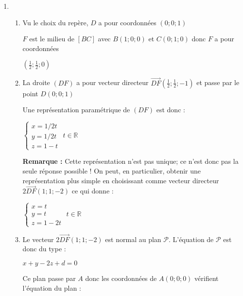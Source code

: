 \begin{corrige}
     \begin{enumerate}
          \item
          \begin{enumerate}[label=\alph*.]
               \item
               Vu le choix du repère, $D$ a pour coordonnées $\left(0;0;1\right)$
               \par
               $F$ est le milieu de $\left[BC\right]$ avec $B\left(1;0;0\right)$ et $C\left(0;1;0\right)$ donc $F$ a pour coordonnées
               \par
               $\left(\frac{1}{2};\frac{1}{2};0\right)$
               \item
               La droite $\left(DF\right)$ a pour vecteur directeur $\overrightarrow{DF}\left(\frac{1}{2};\frac{1}{2};-1\right)$ et passe par le point  $D\left(0;0;1\right)$
               \par
               Une représentation paramétrique de $\left(DF\right)$ est donc :
               \par
               $\left\{ \begin{matrix} x=1/2 t  \\ y=1/2 t  \\ z=1-t \end{matrix}\right.$    $       t\in \mathbb{R}$
\par
                    \textbf{Remarque : }
                    Cette représentation n'est pas unique; ce n'est donc pas la seule réponse possible ! On peut, en particulier, obtenir une représentation plus simple en choisissant comme vecteur directeur $2\overrightarrow{DF}\left(1;1;-2\right)$ ce qui donne :
                    \par
                    $\left\{ \begin{matrix} x=t  \\ y=t  \\ z=1-2t \end{matrix}\right.$    $       t\in \mathbb{R}$
                         \item
                         Le vecteur $2\overrightarrow{DF}\left(1;1;-2\right)$ est normal au plan $\mathscr P$. L'équation de $\mathscr P$ est donc du type :
                         \par
                         $x+y-2z+d=0$
                         \par
                         Ce plan passe par $A$ donc les coordonnées de $A\left(0;0;0\right)$ vérifient l'équation du plan :

\end{enumerate}
\end{enumerate}
\end{corrige}
